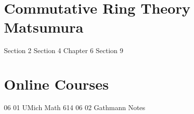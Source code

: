 \documentclass{article}
\begin{document}
\newpage\part{Commutative Ring Theory Matsumura}
{Section 2}
{Section 4}
{Chapter 6}
{Section 9}

\newpage\part{Online Courses}
{06 01 UMich Math 614}
{06 02 Gathmann Notes}

\newpage

\end{document}
